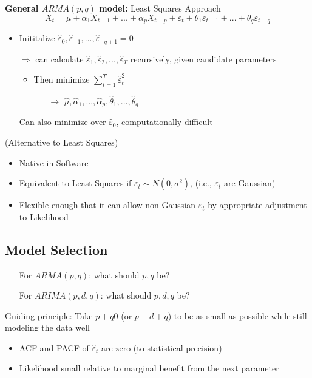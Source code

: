 \textbf{General $ARMA(p,q)$ model:} \quad Least Squares Approach
\[
X_t=\mu+\alpha_1X_{t-1}+...+\alpha_p X_{t-p}+\varepsilon_t+\theta_1 \varepsilon_{t-1}+...+\theta_q\varepsilon_{t-q}
\]
\begin{itemize}
    \item Inititalize $\hat{\varepsilon}_0, \hat{\varepsilon}_{-1},...,\hat{\varepsilon}_{-q+1}=0 $
    \item[$\Rightarrow$] can calculate $\hat{\varepsilon}_1,\hat{\varepsilon}_2,...,\hat{\varepsilon}_T $ recursively, given candidate parameters
    \begin{itemize}
        \item Then minimize $\sum_{t=1}^T\hat{\varepsilon}_t^2 $
        \begin{itemize}
            \item[$\rightarrow$] $\hat{\mu},\hat{\alpha}_1,...,\hat{\alpha}_p, \hat{\theta}_1,...,\hat{\theta}_q $
        \end{itemize}
    \end{itemize}
    \item[] Can also minimize over $\hat{\varepsilon}_0$, computationally difficult 
\end{itemize}
 \quad (Alternative to Least Squares)
\begin{itemize}
    \item Native in Software
    \item Equivalent to Least Squares if $\varepsilon_t \sim N(0,\sigma^2)$, (i.e., $\varepsilon_t$ are Gaussian)
    \item Flexible enough that it can allow non-Gaussian $\varepsilon_t$ by appropriate adjustment to Likelihood
\end{itemize}

\subsection{Model Selection}

\begin{itemize}
    \item[] For $ARMA(p,q)$: \quad what should $p,q$ be?
    \item[] For $ARIMA(p,d,q)$: \quad what should $p,d,q$ be?
\end{itemize}
Guiding principle: Take $p+q0$ (or $p+d+q$) to be as small as possible while still modeling the data well
\begin{itemize}
    \item ACF and PACF of $\hat{\varepsilon}_t$ are zero (to statistical precision)
    \item Likelihood small relative to marginal benefit from the next parameter
\end{itemize}

